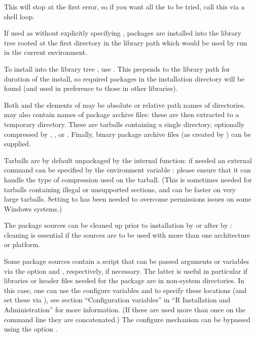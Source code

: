 %
\begin{Details}\relax
This will stop at the first error, so if you want all the 
to be tried, call this via a shell loop.

If used as  without explicitly specifying
, packages are installed into the library tree rooted at the
first directory in the library path which would be used by \R{} run in
the current environment.

To install into the library tree , use
.
This prepends  to the library path for
duration of the install, so required packages in the installation
directory will be found (and used in preference to those in other
libraries).

Both  and the elements of  may be absolute or
relative path names of directories.   may also contain
names of package archive files: these are then extracted to a
temporary directory.  These are tarballs containing a single
directory, optionally compressed by , ,
 or .
Finally, binary package archive files (as created by
) can be supplied.

Tarballs are by default unpackaged by the internal 
function: if needed an external  command can be specified
by the environment variable : please ensure that it
can handle the type of compression used on the tarball.  (This is
sometimes needed for tarballs containing illegal or unsupported
sections, and can be faster on very large tarballs.   Setting
 to  has been needed to overcome
permissions issues on some Windows systems.)

The package sources can be cleaned up prior to installation by
 or after by : cleaning is
essential if the sources are to be used with more than one
architecture or platform.

Some package sources contain a  script that can be
passed arguments or variables via the option 
and , respectively, if necessary.  The latter
is useful in particular if libraries or header files needed for the
package are in non-system directories.  In this case, one can use the
configure variables  and  to specify these
locations (and set these via ), see section
``Configuration variables'' in ``R Installation and
Administration'' for more information.  (If these are used more than
once on the command line they are concatenated.)  The configure
mechanism can be bypassed using the option .


\end{Details}
